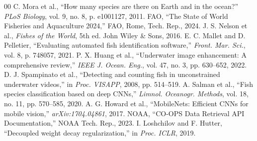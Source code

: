 \documentclass[conference]{IEEEtran}
\begin{document}
\begin{thebibliography}{00}
 C. Mora et al., ``How many species are there on Earth and in the ocean?'' \textit{PLoS Biology}, vol. 9, no. 8, p. e1001127, 2011.
 FAO, ``The State of World Fisheries and Aquaculture 2024,'' FAO, Rome, Tech. Rep., 2024.
 J. S. Nelson et al., \textit{Fishes of the World}, 5th ed. John Wiley \& Sons, 2016.
 E. C. Mallet and D. Pelletier, ``Evaluating automated fish identification software,'' \textit{Front. Mar. Sci.}, vol. 8, p. 748057, 2021.
 P. X. Huang et al., ``Underwater image enhancement: A comprehensive review,'' \textit{IEEE J. Ocean. Eng.}, vol. 47, no. 3, pp. 630--652, 2022.
 D. J. Spampinato et al., ``Detecting and counting fish in unconstrained underwater videos,'' in \textit{Proc. VISAPP}, 2008, pp. 514--519.
 A. Salman et al., ``Fish species classification based on deep CNNs,'' \textit{Limnol. Oceanogr. Methods}, vol. 18, no. 11, pp. 570--585, 2020.
 A. G. Howard et al., ``MobileNets: Efficient CNNs for mobile vision,'' \textit{arXiv:1704.04861}, 2017.
 NOAA, ``CO-OPS Data Retrieval API Documentation,'' NOAA Tech. Rep., 2023.
 I. Loshchilov and F. Hutter, ``Decoupled weight decay regularization,'' in \textit{Proc. ICLR}, 2019.
\end{thebibliography}
\end{document}
